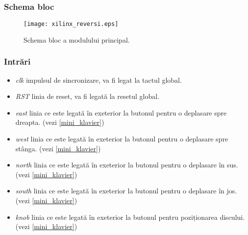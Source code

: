 \documentclass[12pt,twoside,a4paper,fleqn]{book}
\theoremstyle{definition}
\begin{document}
\subsubsection{Schema bloc}
\begin{figure}[h]
\texttt{[image: xilinx\_reversi.eps]}
\caption{\small{Schema bloc a modulului principal.}}
\label{fig:xilinx_top}
\end{figure}


\subsubsection{Intrări}
\begin{itemize}
\item \emph{clk} impulsul de sincronizare, va fi legat la tactul global.
\item \emph{RST} linia de reset, va fi legată la resetul global.
\item \emph{east} linia ce este legată în exeterior la butonul pentru o deplasare spre dreapta. (vezi \ref{mini_klavier})
\item \emph{west} linia ce este legată în exeterior la butonul pentru o deplasare spre stânga. (vezi \ref{mini_klavier})
\item \emph{north} linia ce este legată în exeterior la butonul pentru o deplasare în sus. (vezi \ref{mini_klavier})
\item \emph{south} linia ce este legată în exeterior la butonul pentru o deplasare în jos. (vezi \ref{mini_klavier})
\item \emph{knob} linia ce este legată în exeterior la butonul pentru poziționarea discului. (vezi \ref{mini_klavier})

\end{itemize}
\end{document}
